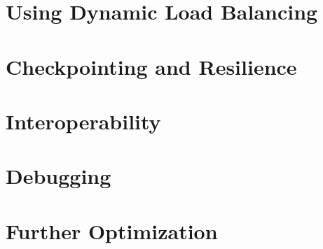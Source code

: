 \documentclass{beamer}
\begin{document}
\section[LB]{Using Dynamic Load Balancing}

\section[Fault Tol]{Checkpointing and Resilience}

\section[AMPI & Interop]{Interoperability}

\section[Debugging]{Debugging}


\section[Messages, Groups, Shared Mem]{Further Optimization}


\end{document}

